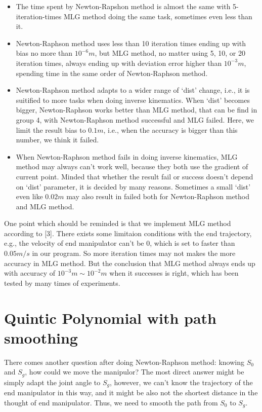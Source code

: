 \documentclass[letterpaper, 10 pt, conference]{ieeeconf}  %
\begin{document}
\begin{itemize}

\item  The time spent by Newton-Rapshon method is almost the same with 5-iteration-times MLG method doing the same task, sometimes even less than it.
\item  Newton-Raphson method uses less than 10 iteration times ending up with bias no more than $10^{-6}m$, but MLG method, no matter using 5, 10, or 20 iteration times, always ending up with deviation error higher than $10^{-3}m$, spending time in the same order of Newton-Raphson method.  
\item Newton-Raphson method adapts to a wider range of `dist' change, i.e., it is suitified to more tasks when doing inverse kinematics. When `dist' becomes bigger, Newton-Raphson works better than MLG method, that can be find in group 4, with Newton-Raphson method successful and MLG failed. Here, we limit the result bias to $0.1m$, i.e., when the accuracy is bigger than this number, we think it failed. 
\item When Newton-Raphson method fails in doing inverse kinematics, MLG method may always can't work well, because they both use the gradient of current point. Minded that whether the result fail or success doesn't depend on `dist' parameter, it is decided by many reasons. Sometimes a small `dist' even like $0.02m$ may also result in failed both for Newton-Raphson method and MLG method.

\end{itemize}

One point which should be reminded is that we implement MLG method according to [3]. There exists some limitaion conditions with the end trajectory, e.g., the velocity of end manipulator can't be 0, which is set to faster than $0.05m/s$ in our program. So more iteration times may not makes the more accuracy in MLG method. But the conclusion that MLG method always ends up with accuracy of $10^{-3}m\sim10^{-2}m$ when it successes is right, which has been tested by many times of experiments. 

\section{Quintic Polynomial with path smoothing}

There comes another question after doing Newton-Raphson method: knowing $S_{0}$ and $S_{g}$, how could we move the manipulor? The most direct answer might be simply adapt the joint angle to $S_{g}$, however, we can't know the trajectory of the end manipulator in this way, and it might be also not the shortest distance in the thought of end manipulator. Thus, we need to smooth the path from $S_{0}$ to $S_{g}$. 
\end{document}
